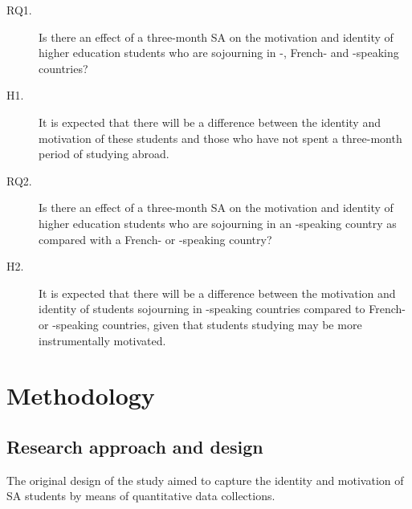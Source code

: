 \documentclass[output=paper]{langsci/langscibook}
\begin{document}
\begin{description}
 \item[RQ1.] Is there an effect of a three-month SA on the motivation and identity of higher education students who are sojourning in -, French- and -speaking countries? 
 \item[H1.] It is expected that there will be a difference between the identity and motivation of these students and those who have not spent a three-month period of studying abroad.

 \item[RQ2.] Is there an effect of a three-month SA on the motivation and identity of higher education students who are sojourning in an -speaking country as compared with a French- or -speaking country? 

 \item[H2.] It is expected that there will be a difference between the motivation and identity of students sojourning in -speaking countries compared to French- or -speaking countries, given that students studying  may be more instrumentally motivated. 

\end{description}




\section{Methodology}

\subsection{Research approach and design}


The original design of the study aimed to capture the identity and motivation of SA students by means of quantitative data collections.
\end{document}
